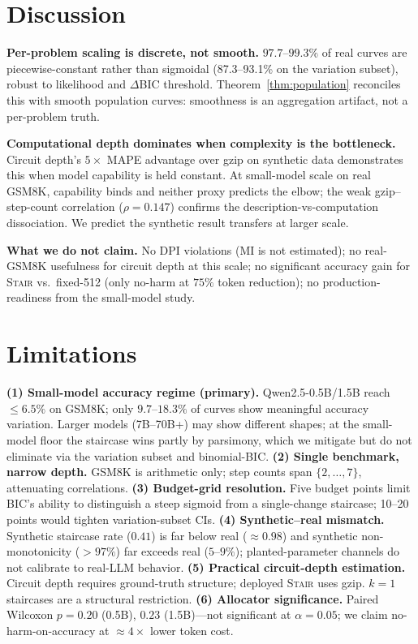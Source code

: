 \documentclass{article}
\newcommand{\method}{\textsc{Stair}}
\begin{document}
\section{Discussion}
\label{sec:discussion}

\textbf{Per-problem scaling is discrete, not smooth.}  $97.7$--$99.3\%$ of real curves are piecewise-constant rather than sigmoidal (87.3--93.1\% on the variation subset), robust to likelihood and $\Delta$BIC threshold.  Theorem~\ref{thm:population} reconciles this with smooth population curves: smoothness is an aggregation artifact, not a per-problem truth.

\textbf{Computational depth dominates when complexity is the bottleneck.}  Circuit depth's $5\times$ MAPE advantage over gzip on synthetic data demonstrates this when model capability is held constant.  At small-model scale on real GSM8K, capability binds and neither proxy predicts the elbow; the weak gzip--step-count correlation ($\rho{=}0.147$) confirms the description-vs-computation dissociation.  We predict the synthetic result transfers at larger scale.

\textbf{What we do not claim.}  No DPI violations (MI is not estimated); no real-GSM8K usefulness for circuit depth at this scale; no significant accuracy gain for \method{} vs.\ fixed-512 (only no-harm at $75\%$ token reduction); no production-readiness from the small-model study.

\section{Limitations}
\label{sec:limitations}

\textbf{(1) Small-model accuracy regime (primary).}  Qwen2.5-0.5B/1.5B reach $\leq 6.5\%$ on GSM8K; only $9.7$--$18.3\%$ of curves show meaningful accuracy variation.  Larger models (7B--70B+) may show different shapes; at the small-model floor the staircase wins partly by parsimony, which we mitigate but do not eliminate via the variation subset and binomial-BIC.  \textbf{(2) Single benchmark, narrow depth.}  GSM8K is arithmetic only; step counts span $\{2,\ldots,7\}$, attenuating correlations.  \textbf{(3) Budget-grid resolution.}  Five budget points limit BIC's ability to distinguish a steep sigmoid from a single-change staircase; 10--20 points would tighten variation-subset CIs.  \textbf{(4) Synthetic--real mismatch.}  Synthetic staircase rate ($0.41$) is far below real ($\approx 0.98$) and synthetic non-monotonicity ($>$$97\%$) far exceeds real ($5$--$9\%$); planted-parameter channels do not calibrate to real-LLM behavior.  \textbf{(5) Practical circuit-depth estimation.}  Circuit depth requires ground-truth structure; deployed \method{} uses gzip.  $k{=}1$ staircases are a structural restriction.  \textbf{(6) Allocator significance.}  Paired Wilcoxon $p{=}0.20$ (0.5B), $0.23$ (1.5B)---not significant at $\alpha{=}0.05$; we claim no-harm-on-accuracy at $\approx 4\times$ lower token cost.
\end{document}
